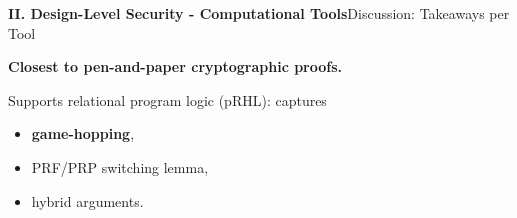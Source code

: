 \documentclass[10pt,aspectratio=1610,compress,dvipsnames]{beamer}
\begin{document}
\begin{frame}[fragile]{\bfseries II. Design-Level Security - Computational Tools}{Discussion: Takeaways per Tool}
\begin{description}[style=nextline]
	\item[{\color{cseblue}\bfseries EasyCrypt}] \textbf{Closest to pen-and-paper cryptographic proofs.}
	\item[$\to$] Supports relational program logic (pRHL): captures \begin{itemize}
		\item \textbf{game-hopping}, 
		\item PRF/PRP switching lemma, 
		\item hybrid arguments.
	\end{itemize}
\end{description}
\end{frame}
\end{document}
